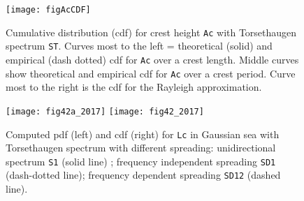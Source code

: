 \begin{figure}[tbh]
\centerline{
\texttt{[image: figAcCDF]}
}
\vspace{-3mm}
\caption[Cumulative distribution for crest height Ac]%
{Cumulative distribution (cdf) for crest height {\tt Ac}
with Torsethaugen spectrum {\tt ST}.
Curves most to the left = theoretical (solid)  and empirical
(dash dotted) cdf for {\tt Ac} over a crest length. 
Middle curves show theoretical and empirical
cdf for {\tt Ac} over a crest period. Curve most to the right 
is the cdf for the Rayleigh approximation.}
\label{fig:AcCDF}
\end{figure}

\begin{figure}[tbh]
\centerline{
\texttt{[image: fig42a\_2017]}
\hspace{5mm}
\texttt{[image: fig42\_2017]}
}
\vspace{-3mm}
\caption[Density and cumulative distribution for
{\tt Lc} with directional spreading]%
{Computed pdf (left) and cdf (right)
for {\tt Lc} in Gaussian sea with Torsethaugen
spectrum with different spreading: unidirectional spectrum {\tt S1}
(solid line) ; frequency independent spreading {\tt SD1}
(dash-dotted line); frequency dependent spreading {\tt SD12}
(dashed line).}
\label{fig:42}
\end{figure}

